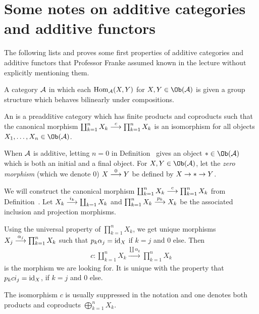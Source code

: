 \documentclass[a4paper,parskip=half,numbers=enddot, DIV=12]{scrreprt}
\begin{document}
\section{Some notes on additive categories and additive functors}
The following lists and proves some first properties of additive categories and additive functors that Professor Franke assumed known in the lecture without explicitly mentioning them.
\begin{defi}
	\begin{alphanumerate}
		\item {}A  category $\mathcal{A}$ in which each $\operatorname{Hom}_{\mathcal{A}}(X,Y)$ for $X,Y\in\Ob(\Aa)$ is given a group structure which behaves bilinearly under compositions.
		\item An  is a preadditive category which has finite products and coproducts such that the canonical morphism $\coprod_{k=1}^nX_k\morphism[c] \prod_{k=1}^{n}X_k$ is an isomorphism for all objects $X_1,\ldots,X_n\in\Ob(\Aa)$.
	\end{alphanumerate}
\end{defi}
\begin{rem*}
	\begin{alphanumerate}
		\item When $\mathcal{A}$ is additive, letting $n=0$ in Definition~ gives an object $*\in\Ob(\Aa)$ which is both an initial and a final object. For $X,Y\in\Ob(\Aa)$, let the \emph{zero morphism} (which we denote $0$) $X\morphism[0]Y$ be defined by $X\morphism *\morphism Y$.
		\item We will construct the canonical morphism $\coprod_{k=1}^nX_k\morphism[c] \prod_{k=1}^{n}X_k$ from Definition~. Let $X_k\morphism[i_k]\coprod_{k=1}X_k$ and $\prod_{k=1}^nX_k\morphism[p_k]X_k$ be the associated inclusion and projection morphisms.
		
		Using the universal property of $\prod_{k=1}^{n}X_k$, we get unique morphisms $X_j\morphism[\alpha_j]\prod_{k=1}^{n}X_k$ such that $p_k\alpha_j=\operatorname{id}_X$ if $k=j$ and $0$ else. Then 
		\begin{align*}
		c\colon \coprod_{k=1}^nX_k\xrightarrow{\coprod\alpha_k}\prod_{k=1}^{n}X_k
		\end{align*}
		is the morphism we are looking for. It is unique with the property that $p_k c i_j=\operatorname{id}_X$, if $k=j$ and $0$ else.
		\item The isomorphism $c$ is usually suppressed in the notation and one denotes both products and coproducts $\bigoplus_{k=1}^nX_k$.
	\end{alphanumerate}
\end{rem*}
\end{document}
